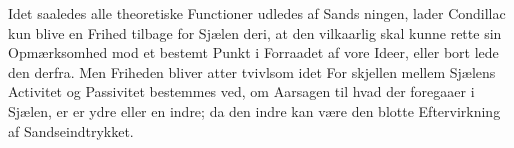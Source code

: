 \documentclass[12pt,a4paper]{book}
\begin{document}
Idet saaledes alle theoretiske Functioner udledes af Sands\-%
ningen, lader Condillac kun blive en Frihed tilbage for Sjælen
deri, at den vilkaarlig skal kunne rette sin Opmærksomhed
mod et bestemt Punkt i Forraadet af vore Ideer, eller bort\-%
lede den derfra. Men Friheden bliver atter tvivlsom idet For\-%
skjellen mellem Sjælens Activitet og Passivitet bestemmes ved,
om Aarsagen til hvad der foregaaer i Sjælen, er er ydre eller
en indre; da den indre kan være den blotte Eftervirkning af
Sandseindtrykket.
\end{document}
